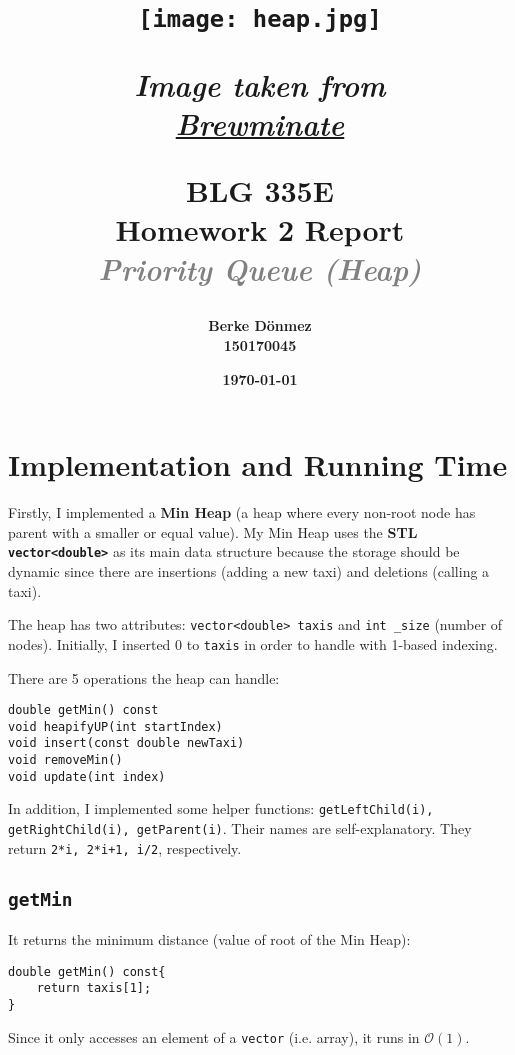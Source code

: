 \documentclass[12pt, a4paper]{article}
\title{
    \begin{figure}[H]
        \centering
        \caption*{\textit{Image taken from \href{https://brewminate.com/on-vagueness-or-when-is-a-heap-of-sand-not-a-heap-of-sand/}{Brewminate}}}
        \texttt{[image: heap.jpg]}
        \label{fig:heap}
    \end{figure}
    \textbf{\Huge BLG 335E\\Homework 2 Report\\\textit{\textcolor{gray}{Priority Queue (Heap)}}}
}
\author{\textbf{Berke Dönmez}\\
        \textbf{150170045}}
\date{\textbf{\today}}
\begin{document}
\begin{titlepage}
    \centering
    \maketitle
    \thispagestyle{empty}
\end{titlepage}
\section{Implementation and Running Time}
Firstly, I implemented a \textbf{Min Heap} (a heap where every non-root node has parent with a smaller or equal value). My Min Heap uses the \textbf{STL \texttt{vector<double>}} as its main data structure because the storage should be dynamic since there are insertions (adding a new taxi) and deletions (calling a taxi).

\noindent The heap has two attributes: \texttt{vector<double> taxis} and \texttt{int \_size} (number of nodes). Initially, I inserted 0 to \texttt{taxis} in order to handle with 1-based indexing.

\noindent There are 5 operations the heap can handle:
\begin{lstlisting}
double getMin() const
void heapifyUP(int startIndex)
void insert(const double newTaxi)
void removeMin()
void update(int index)
\end{lstlisting}
In addition, I implemented some helper functions: \texttt{getLeftChild(i), getRightChild(i), getParent(i)}. Their names are self-explanatory. They return \texttt{2*i, 2*i+1, i/2}, respectively.
\subsection{\texttt{getMin}}
\noindent It returns the minimum distance (value of root of the Min Heap):
\begin{lstlisting}
double getMin() const{
    return taxis[1];
}
\end{lstlisting}
Since it only accesses an element of a \texttt{vector} (i.e. array), it runs in $\mathcal{O}(1)$.
\newpage
\end{document}
